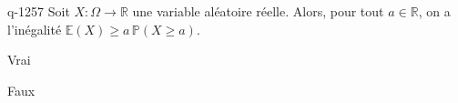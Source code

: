 \begin{truefalse}{q-1257}
Soit $X: \Omega \to \mathbb{R}$ une variable aléatoire réelle. Alors, pour tout $a\in \mathbb{R}$, on a l'inégalité $\mathbb{E}(X)\geq a\,\mathbb{P}(X\geq a)$.
\item Vrai
\item* Faux
\end{truefalse}

